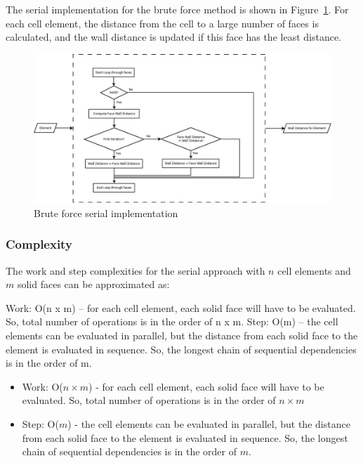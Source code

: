 \documentclass[]{aiaa-tc}%
\begin{document}
The serial implementation for the brute force method is shown in
Figure~\ref{f:bf_2}. For each cell element, the distance from the cell
to a large number of faces is calculated, and the wall distance is
updated if this face has the least distance. 

\begin{figure}
  \centering
  \includegraphics[]{figures/brute_force/bf_2}
  \caption{Brute force serial implementation}
  \label{f:bf_2}
\end{figure}



\subsubsection{Complexity}

The work and step complexities for the serial approach with $n$ cell
elements and $m$ solid faces can be approximated as: 

Work: O(n x m) – for each cell element, each solid face will have to
be evaluated.  So, total number of operations is in the order of n x
m. Step: O(m) – the cell elements can be evaluated in parallel, but the
distance from each solid face to the element is evaluated in sequence.
So, the longest chain of sequential dependencies is in the order of m.


\begin{itemize}
  
\item Work: O($n \times m$) - for each cell element, each solid face
  will have to be evaluated.  So, total number of operations is in the
  order of $n \times m$
  
\item Step: O($m$) - the cell elements can be evaluated in parallel,
  but the distance from each solid face to the element is evaluated in
  sequence.  So, the longest chain of sequential dependencies is in
  the order of $m$.
  
\end{itemize}
\end{document}
